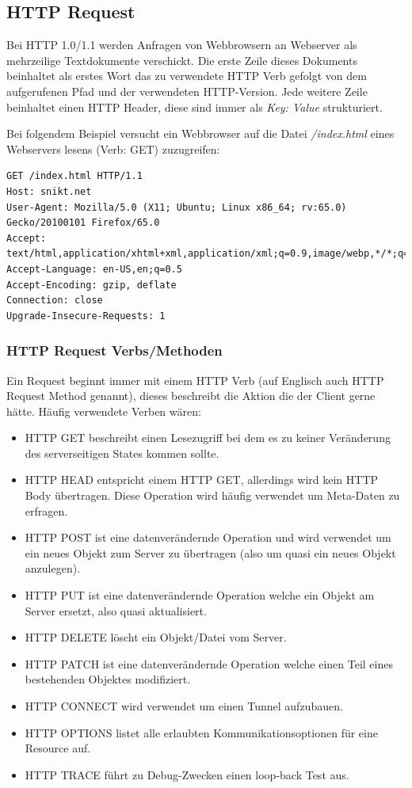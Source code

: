 \subsection{HTTP Request}

Bei HTTP 1.0/1.1 werden Anfragen von Webbrowsern an Webserver als mehrzeilige Textdokumente verschickt. Die erste Zeile dieses Dokuments beinhaltet als erstes Wort das zu verwendete HTTP Verb gefolgt von dem aufgerufenen Pfad und der verwendeten HTTP-Version. Jede weitere Zeile beinhaltet einen HTTP Header, diese sind immer als \textit{Key: Value} strukturiert.

Bei folgendem Beispiel versucht ein Webbrowser auf die Datei \textit{/index.html} eines Webservers lesens (Verb: GET) zuzugreifen:

\begin{verbatim}
GET /index.html HTTP/1.1
Host: snikt.net
User-Agent: Mozilla/5.0 (X11; Ubuntu; Linux x86_64; rv:65.0) Gecko/20100101 Firefox/65.0
Accept: text/html,application/xhtml+xml,application/xml;q=0.9,image/webp,*/*;q=0.8
Accept-Language: en-US,en;q=0.5
Accept-Encoding: gzip, deflate
Connection: close
Upgrade-Insecure-Requests: 1
\end{verbatim}

\subsubsection{HTTP Request Verbs/Methoden}

Ein Request beginnt immer mit einem HTTP Verb (auf Englisch auch HTTP Request Method genannt), dieses beschreibt die Aktion die der Client gerne hätte. Häufig verwendete Verben wären:

\begin{itemize}
	\item HTTP GET beschreibt einen Lesezugriff bei dem es zu keiner Veränderung des serverseitigen States kommen sollte.
	\item HTTP HEAD entspricht einem HTTP GET, allerdings wird kein HTTP Body übertragen. Diese Operation wird häufig verwendet um Meta-Daten zu erfragen.
	\item HTTP POST ist eine datenverändernde Operation und wird verwendet um ein neues Objekt zum Server zu übertragen (also um quasi ein neues Objekt anzulegen).
	\item HTTP PUT ist eine datenverändernde Operation welche ein Objekt am Server ersetzt, also quasi aktualisiert.
	\item HTTP DELETE löscht ein Objekt/Datei vom Server.
	\item HTTP PATCH ist eine datenverändernde Operation welche einen Teil eines bestehenden Objektes modifiziert.
	\item HTTP CONNECT wird verwendet um einen Tunnel aufzubauen.
	\item HTTP OPTIONS listet alle erlaubten Kommunikationsoptionen für eine Resource auf.
	\item HTTP TRACE führt zu Debug-Zwecken einen loop-back Test aus.
\end{itemize}

